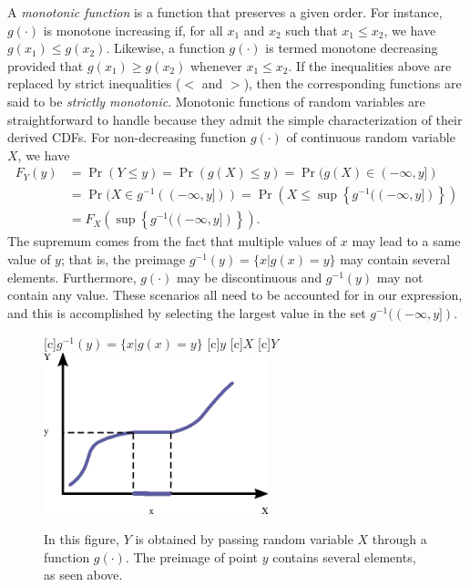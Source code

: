 A \emph{monotonic function} is a function that preserves a given order. 
For instance, $g(\cdot)$ is monotone increasing if, for all $x_1$ and $x_2$ such that $x_1 \leq x_2$, we have $g(x_1) \leq g(x_2)$.
Likewise, a function $g(\cdot)$ is termed monotone decreasing provided that $g(x_1) \geq g(x_2)$ whenever $x_1 \leq x_2$.
If the inequalities above are replaced by strict inequalities ($<$ and $>$), then the corresponding functions are said to be \emph{strictly monotonic}. 
Monotonic functions of random variables are straightforward to handle because they admit the simple characterization of their derived CDFs.
For non-decreasing function $g(\cdot)$ of continuous random variable $X$, we have
\begin{equation} \label{equation:MonotoneIncreasingCDF}
\begin{split}
F_Y(y) &= \Pr ( Y \leq y) = \Pr ( g(X) \leq y)
= \Pr ( g(X) \in (- \infty, y]) \\
&= \Pr ( X \in g^{-1} ( (- \infty, y] ) )
= \Pr \left( X \leq \sup \left\{ g^{-1} ( (- \infty, y] ) \right\} \right) \\
&= F_X \left( \sup \left\{ g^{-1} ( (- \infty, y] ) \right\} \right) .
\end{split}
\end{equation}
The supremum comes from the fact that multiple values of $x$ may lead to a same value of $y$; that is, the preimage $g^{-1}(y) = \{ x | g(x) = y \}$ may contain several elements.
Furthermore, $g(\cdot)$ may be discontinuous and $g^{-1} (y)$ may not contain any value.
These scenarios all need to be accounted for in our expression, and this is accomplished by selecting the largest value in the set $g^{-1} ( (- \infty, y] )$.

\begin{figure}[ht]
\begin{center}
\begin{psfrags}
[c]{$g^{-1} (y) = \{ x | g(x) = y \}$}
[c]{$y$}
[c]{$X$}
[c]{$Y$}
\includegraphics[width=6.5cm]{Figures/9Chapter/MonotoneIncreasing}
\end{psfrags}
\caption{In this figure, $Y$ is obtained by passing random variable $X$ through a function $g(\cdot)$.
The preimage of point $y$ contains several elements, as seen above.}
\end{center}
\end{figure}

